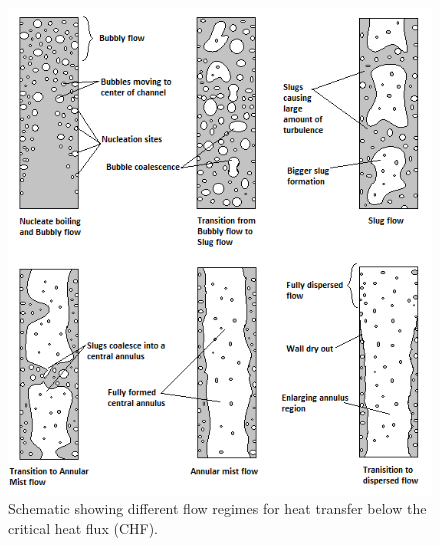 \documentclass[11pt,letterpaper,titlepage]{article}
\begin{document}
	\begin{center}
		\begin{minipage}[c]{0.85\textwidth}	
			\begin{figure}[H]
			
				\includegraphics{FlowRegimePattern.png}
				\caption{Schematic showing different flow regimes for heat transfer below the critical heat flux (CHF).}
				\label{figure:FlowRegimePattern}
			\end{figure}
		\end{minipage}
	\end{center}
\vspace{0.5cm}
\end{document}
